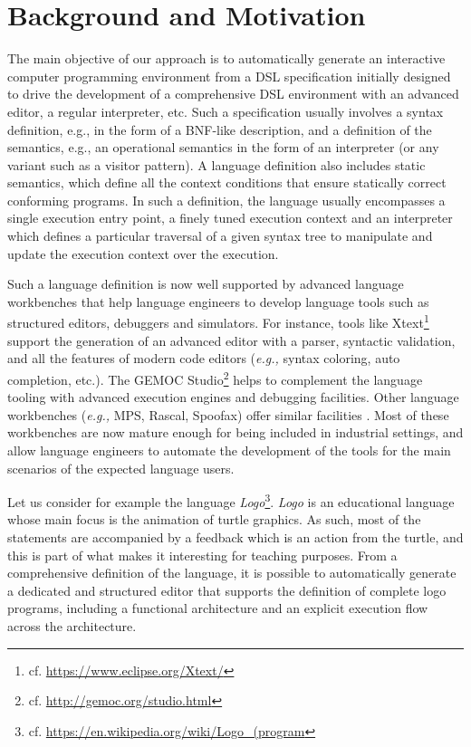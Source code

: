\section{Background and Motivation}
\label{motiv}

The main objective of our approach is to automatically generate an interactive computer programming environment from a DSL specification initially designed to drive the development of a comprehensive DSL environment with an advanced editor, a regular interpreter, etc. Such a specification usually involves a syntax definition, e.g., in the form of a BNF-like description, and a definition of the semantics, e.g., an operational semantics in the form of an interpreter (or any variant such as a visitor pattern). A language definition also includes static semantics, which define all the context conditions that ensure statically correct conforming programs. In such a definition, the language usually encompasses a single execution entry point, a finely tuned execution context and an interpreter which defines a particular traversal of a given syntax tree to manipulate and update the execution context over the execution. 

Such a language definition is now well supported by advanced language workbenches that help language engineers to develop language tools such as structured editors, debuggers and simulators. For instance, tools like Xtext\footnote{cf. \url{https://www.eclipse.org/Xtext/}} support the generation of an advanced editor with a parser, syntactic validation, and all the features of modern code editors (\emph{e.g.,} syntax coloring, auto completion, etc.). The GEMOC Studio\footnote{cf. \url{http://gemoc.org/studio.html}} helps to complement the language tooling with advanced execution engines and debugging facilities. Other language workbenches (\emph{e.g.,} MPS, Rascal, Spoofax) offer similar facilities \cite{DBLP:journals/cl/ErdwegSVTBCGH0L15}. Most of these workbenches are now mature enough for being included in industrial settings, and allow language engineers to automate the development of the tools for the main scenarios of the expected language users. 

Let us consider for example the language \textit{Logo}\footnote{cf. \url{https://en.wikipedia.org/wiki/Logo_(program}}. \textit{Logo} is an educational language whose main focus is the animation of turtle graphics. As such, most of the statements are accompanied by a feedback which is an action from the turtle, and this is part of what makes it interesting for teaching purposes. From a comprehensive definition of the language, it is possible to automatically generate a dedicated and structured editor that supports the definition of complete logo programs, including a functional architecture and an explicit execution flow across the architecture. 

